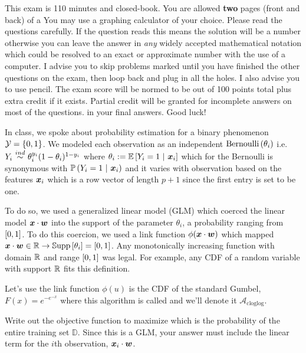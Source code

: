 \documentclass[12pt]{article}
\begin{document}
This exam is 110 minutes and closed-book. You are allowed \textbf{two} pages (front and back) of a  You may use a graphing calculator of your choice. Please read the questions carefully. If the question reads  this means the solution will be a number otherwise you can leave the answer in \textit{any} widely accepted mathematical notation which could be resolved to an exact or approximate number with the use of a computer. I advise you to skip problems marked  until you have finished the other questions on the exam, then loop back and plug in all the holes. I also advise you to use pencil. The exam score will be normed to be out of 100 points total plus extra credit if it exists. Partial credit will be granted for incomplete answers on most of the questions.  in your final answers. Good luck!

\pagebreak

\problem In class, we spoke about probability estimation for a binary phenomenon $\mathcal{Y} = \left\{0,1\right\}$. We modeled each observation as an independent $\mathrm{Bernoulli}\left(\theta_i\right)$ i.e. $Y_i \inddist  \theta_i^{y_i} (1 - \theta_i)^{1-y_i}$ where $\theta_i := \mathbb{E}\left[Y_i = 1~|~\boldsymbol{x}_i\right]$ which for the Bernoulli is synonymous with $\mathbb{P}\left(Y_i = 1~|~\boldsymbol{x}_i\right)$ and it varies with observation based on the features $\boldsymbol{x}_i$ which is a row vector of length $p+1$ since the first entry is set to be one. 

To do so, we used a generalized linear model (GLM) which coerced the linear model $\boldsymbol{x} \cdot \boldsymbol{w}$ into the support of the parameter $\theta_i$, a probability ranging from $\left[0,1\right]$. To do this coercion, we used a link function $\phi(\boldsymbol{x} \cdot \boldsymbol{w})$ which mapped $\boldsymbol{x} \cdot \boldsymbol{w} \in \mathbb{R} \rightarrow \mathbb{S}\text{upp}\left[\theta_i\right] = \left[0,1\right]$. Any monotonically increasing function with domain $\mathbb{R}$ and range $\left[0,1\right]$ was legal. For example, any CDF of a random variable with support $\mathbb{R}$ fits this definition. 

Let's use the link function $\phi(u)$ is the CDF of the standard Gumbel, $F(x) = e^{-e^{-x}}$ where this algorithm is called  and we'll denote it $\mathcal{A}_{\text{cloglog}}$.

\benum
{} Write out the objective function to maximize which is the probability of the entire training set $\mathbb{D}$. Since this is a GLM, your answer must include the linear term for the $i$th observation, $\boldsymbol{x}_i \cdot \boldsymbol{w}$. \\
\end{document}
